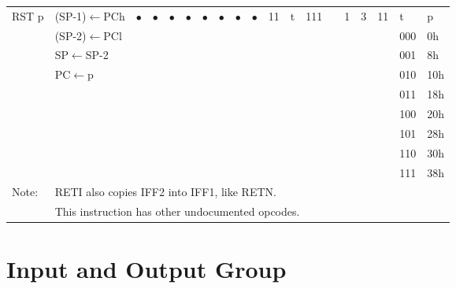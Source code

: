 \documentclass[oneside,a4paper]{book}
\begin{document}
{\begin{tabular}{llc@{ }c@{ }c@{ }c@{ }c@{ }c@{ }c@{ }cc@{ }c@{ }cccccll}
RST p & (SP-1)$\leftarrow$PCh &
	$\bullet$ & $\bullet$ & $\bullet$ & $\bullet$ & $\bullet$ & $\bullet$ & $\bullet$ & $\bullet$ & 11 & t & 111 
	&  & 1 & 3 & 11 & t & p \\ \cline{18-19}
	& (SP-2)$\leftarrow$PCl & \multicolumn{8}{c}{} & \multicolumn{3}{c}{} & & & &  & 000 & 0h\\
	& SP$\leftarrow$SP-2 & \multicolumn{8}{c}{} & \multicolumn{3}{c}{} & & & &  & 001 & 8h \\
	& PC$\leftarrow$p & \multicolumn{8}{c}{} & \multicolumn{3}{c}{} & & & &  & 010 & 10h \\
	& & \multicolumn{8}{c}{} & \multicolumn{3}{c}{} & & & &  & 011 & 18h \\
	& & \multicolumn{8}{c}{} & \multicolumn{3}{c}{} & & & &  & 100 & 20h \\
	& & \multicolumn{8}{c}{} & \multicolumn{3}{c}{} & & & &  & 101 & 28h \\
	& & \multicolumn{8}{c}{} & \multicolumn{3}{c}{} & & & &  & 110 & 30h \\
	& & \multicolumn{8}{c}{} & \multicolumn{3}{c}{} & & & &  & 111 & 38h \\ \hline

Note: & \multicolumn{18}{l}{\parbox{12cm}{\footnotemark[1] RETI also copies IFF2 into IFF1, like RETN.}} \\
      & \multicolumn{18}{l}{\parbox{12cm}{\footnotemark[2] This instruction has other undocumented opcodes.}} \\ \hline

\end{tabular}
}

\section{Input and Output Group}
\end{document}
